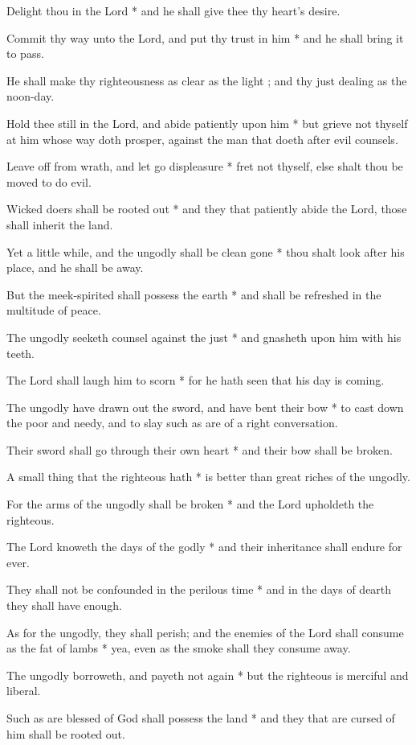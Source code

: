 Delight thou in the Lord * and he shall give thee thy heart's desire.

Commit thy way unto the Lord, and put thy trust in him * and he shall bring it to pass.

He shall make thy righteousness as clear as the light ; and thy just dealing as the noon-day.

Hold thee still in the Lord, and abide patiently upon him * but grieve not thyself at him whose way doth prosper, against the man that doeth after evil counsels.

Leave off from wrath, and let go displeasure * fret not thyself, else shalt thou be moved to do evil.

Wicked doers shall be rooted out * and they that patiently abide the Lord, those shall inherit the land.

Yet a little while, and the ungodly shall be clean gone * thou shalt look after his place, and he shall be away.

But the meek-spirited shall possess the earth * and shall be refreshed in the multitude of peace.

The ungodly seeketh counsel against the just * and gnasheth upon him with his teeth.

The Lord shall laugh him to scorn * for he hath seen that his day is coming.

The ungodly have drawn out the sword, and have bent their bow * to cast down the poor and needy, and to slay such as are of a right conversation.

Their sword shall go through their own heart * and their bow shall be broken.

A small thing that the righteous hath * is better than great riches of the ungodly.

For the arms of the ungodly shall be broken * and the Lord upholdeth the righteous.

The Lord knoweth the days of the godly * and their inheritance shall endure for ever.

They shall not be confounded in the perilous time * and in the days of dearth they shall have enough.

As for the ungodly, they shall perish; and the enemies of the Lord shall consume as the fat of lambs * yea, even as the smoke shall they consume away.

The ungodly borroweth, and payeth not again * but the righteous is merciful and liberal.

Such as are blessed of God shall possess the land * and they that are cursed of him shall be rooted out.

